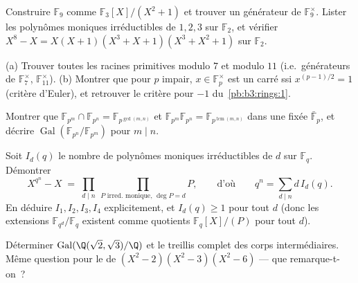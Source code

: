 \begin{exercise}[$\star$]\label{exo:b3:galois:3}
Construire $\mathbb F_9$ comme $\mathbb F_3[X]/(X^2+1)$ et
trouver un générateur de $\mathbb F_9^\times$. Lister les
polynômes moniques irréductibles de  $1, 2, 3$ sur
$\mathbb F_2$, et vérifier $X^8 - X = X(X+1)(X^3+X+1)(X^3+X^2+1)$
sur $\mathbb F_2$.
\end{exercise}

\begin{exercise}[$\star\star$]\label{exo:b3:galois:4}
(a) Trouver toutes les racines primitives modulo $7$ et modulo
$11$ (i.e.\ générateurs de $\mathbb F_7^\times$, $\mathbb
F_{11}^\times$).
(b) Montrer que pour $p$ impair, $x \in \mathbb F_p^\times$ est
un carré ssi $x^{(p-1)/2} = 1$ (critère d'Euler), et retrouver
le critère pour $-1$ du~\cref{pb:b3:rings:1}.
\end{exercise}

\begin{exercise}[$\star\star$]\label{exo:b3:galois:5}
Montrer que $\mathbb F_{p^m} \cap \mathbb F_{p^n} = \mathbb
F_{p^{\gcd(m,n)}}$ et $\mathbb F_{p^m}\mathbb F_{p^n} = \mathbb
F_{p^{\operatorname{lcm}(m,n)}}$ dans une 
fixée $\bar{\mathbb F}_p$, et décrire
$\operatorname{Gal}(\mathbb F_{p^n}/\mathbb F_{p^m})$ pour $m
\mid n$.
\end{exercise}

\begin{exercise}[$\star\star$]\label{exo:b3:galois:6}
Soit $I_d(q)$ le nombre de polynômes moniques irréductibles de
 $d$ sur $\mathbb F_q$. Démontrer
\[
X^{q^n} - X \;=\; \prod_{d \mid n}\ \prod_{P \text{ irred.
monique, } \deg P = d} P ,
\qquad\text{d'où}\qquad
q^n = \sum_{d \mid n} d\, I_d(q).
\]
En déduire $I_1, I_2, I_3, I_4$ explicitement, et $I_d(q) \geq
1$ pour tout $d$ (donc les extensions $\mathbb F_{q^d}/\mathbb
F_q$ existent comme quotients $\mathbb F_q[X]/(P)$ pour tout
$d$).
\end{exercise}

\begin{exercise}[$\star\star$]\label{exo:b3:galois:7}
Déterminer $\operatorname{Gal}(\Q(\sqrt2,\sqrt3)/\Q)$ et le
treillis complet des corps intermédiaires. Même question pour
le  de $(X^2-2)(X^2-3)(X^2-6)$ --- que
remarque-t-on~?
\end{exercise}

